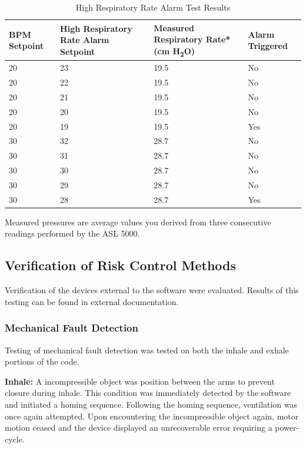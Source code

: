 \documentclass[]{article}
\begin{document}
\begin{center}
	\begin{table}[h]
		\caption{High Respiratory Rate Alarm Test Results}
		\label{tab:high_rr_test}
		\begin{tabular}{ |p{3.7cm}|p{3.3cm}|p{4cm}| p{2.9cm}|}
			
			\hline
			\textbf{BPM Setpoint} & \textbf{High Respiratory Rate Alarm Setpoint} & \textbf{Measured Respiratory Rate* (cm H\textsubscript{2}O)} & \textbf{Alarm Triggered}  \\ \hline
			20 & 23 & 19.5 & No\\ \hline
			20 & 22 & 19.5& No\\ \hline
			20 & 21& 19.5& No\\ \hline
			20 & 20 & 19.5 & No\\ \hline
			20 & 19 & 19.5 & Yes\\ \hline
			30 & 32 & 28.7 & No\\ \hline
			30 & 31 & 28.7 & No\\ \hline
			30 & 30 & 28.7 & No\\ \hline
			30 & 29 & 28.7 & No\\ \hline
			30 & 28 & 28.7 & Yes\\ \hline
		\end{tabular}
		\noindent *Measured pressures are average values you derived from three consecutive readings performed by the ASL 5000.
	\end{table}	
\end{center}


\subsection{Verification of Risk Control Methods}
\label{sect:v_risk}

Verification of the devices external to the software were evaluated.  Results of this testing can be found in external documentation.

\subsubsection{Mechanical Fault Detection}
Testing of mechanical fault detection was tested on both the inhale and exhale portions of the code.

\noindent \textbf{Inhale:} A incompressible object was position between the arms to prevent closure during inhale. This condition was immediately detected by the software and initiated a homing sequence.  Following the homing sequence, ventilation was once again attempted.  Upon encountering the incompressible object again, motor motion ceased and the device displayed an unrecoverable error requiring a power-cycle.
\end{document}
